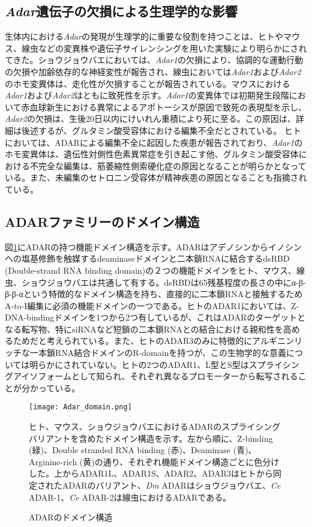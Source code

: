 \subsection{\textit{Adar}遺伝子の欠損による生理学的な影響}
生体内における\textit{Adar}の発現が生理学的に重要な役割を持つことは、ヒトやマウス、線虫などの変異株や遺伝子サイレンシングを用いた実験により明らかにされてきた。ショウジョウバエにおいては、\textit{Adar1}の欠損により、協調的な運動行動の欠損や加齢依存的な神経変性が報告され、線虫においては\textit{Adar1}および\textit{Adar2}のホモ変異体は、走化性が欠損することが報告されている。マウスにおける\textit{Adar1}および\textit{Adar2}はともに致死性を示す。\textit{Adar1}の変異体では初期発生段階において赤血球新生における異常によるアポトーシスが原因で致死の表現型を示し、\textit{Adar2}の欠損は、生後20日以内にけいれん重積により死に至る。この原因は、詳細は後述するが、グルタミン酸受容体における編集不全だとされている。
ヒトにおいては、ADARによる編集不全に起因した疾患が報告されており、\textit{Adar1}のホモ変異体は、遺伝性対側性色素異常症を引き起こす他、グルタミン酸受容体における不完全な編集は、筋萎縮性側索硬化症の原因となることが明らかとなっている。また、未編集のセトロニン受容体が精神疾患の原因となることも指摘されている。

\subsection{ADARファミリーのドメイン構造}
図\ref{fig:adar_domain}にADARの持つ機能ドメイン構造を示す。ADARはアデノシンからイノシンへの塩基修飾を触媒するdeaminaseドメインと二本鎖RNAに結合するdsRBD (Double-strand RNA binding domain)の２つの機能ドメインをヒト、マウス、線虫、ショウジョウバエは共通して有する。dsRBDは65残基程度の長さの中にα-β-β-β-αという特徴的なドメイン構造を持ち、直接的に二本鎖RNAと接触するためA-to-I編集に必須の機能ドメインの一つである。ヒトのADAR1においては、Z-DNA-bindingドメインを1つから2つ有しているが、これはADARのターゲットとなる転写物、特にsiRNAなど短鎖の二本鎖RNAとの結合における親和性を高めるためだと考えられている。また、ヒトのADAR3のみに特徴的にアルギニンリッチな一本鎖RNA結合ドメインのR-domainを持つが、この生物学的な意義については明らかにされていない。ヒトの2つのADAR1、L型とS型はスプライシングアイソフォームとして知られ、それぞれ異なるプロモーターから転写されることが分かっている。

\begin{figure}[!h]
	\begin{center}
		\texttt{[image: Adar\_domain.png]}
	\end{center}
	\caption{ADARのドメイン構造}
	\begin{flushleft}
		\small{ヒト、マウス、ショウジョウバエにおけるADARのスプライシングバリアントを含めたドメイン構造を示す。左から順に、Z-binding (緑)、Double stranded RNA binding (赤)、Deaminase (青)、Arginine-rich (黄)の通り、それぞれ機能ドメイン構造ごとに色分けした。上からADAR1L、ADAR1S、ADAR2、ADAR3はヒトから同定されたADARのバリアント、\textit{Dm} ADARはショウジョウバエ、\textit{Ce} ADAR-1、\textit{Ce} ADAR-2は線虫におけるADARである。}
	\end{flushleft}
	\label{fig:adar_domain}
\end{figure}

